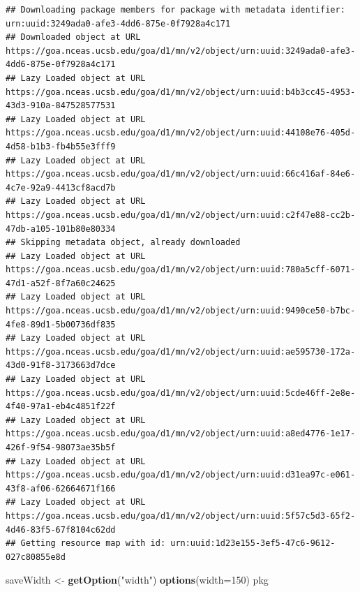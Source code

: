 \documentclass[]{article}
\newenvironment{Shaded}{\begin{snugshade}}{\end{snugshade}}
\newcommand{\DataTypeTok}[1]{\textcolor[rgb]{0.13,0.29,0.53}{#1}}
\newcommand{\DecValTok}[1]{\textcolor[rgb]{0.00,0.00,0.81}{#1}}
\newcommand{\KeywordTok}[1]{\textcolor[rgb]{0.13,0.29,0.53}{\textbf{#1}}}
\newcommand{\NormalTok}[1]{#1}
\newcommand{\StringTok}[1]{\textcolor[rgb]{0.31,0.60,0.02}{#1}}
\begin{document}
\begin{verbatim}
## Downloading package members for package with metadata identifier: urn:uuid:3249ada0-afe3-4dd6-875e-0f7928a4c171
## Downloaded object at URL https://goa.nceas.ucsb.edu/goa/d1/mn/v2/object/urn:uuid:3249ada0-afe3-4dd6-875e-0f7928a4c171
## Lazy Loaded object at URL https://goa.nceas.ucsb.edu/goa/d1/mn/v2/object/urn:uuid:b4b3cc45-4953-43d3-910a-847528577531
## Lazy Loaded object at URL https://goa.nceas.ucsb.edu/goa/d1/mn/v2/object/urn:uuid:44108e76-405d-4d58-b1b3-fb4b55e3fff9
## Lazy Loaded object at URL https://goa.nceas.ucsb.edu/goa/d1/mn/v2/object/urn:uuid:66c416af-84e6-4c7e-92a9-4413cf8acd7b
## Lazy Loaded object at URL https://goa.nceas.ucsb.edu/goa/d1/mn/v2/object/urn:uuid:c2f47e88-cc2b-47db-a105-101b80e80334
## Skipping metadata object, already downloaded
## Lazy Loaded object at URL https://goa.nceas.ucsb.edu/goa/d1/mn/v2/object/urn:uuid:780a5cff-6071-47d1-a52f-8f7a60c24625
## Lazy Loaded object at URL https://goa.nceas.ucsb.edu/goa/d1/mn/v2/object/urn:uuid:9490ce50-b7bc-4fe8-89d1-5b00736df835
## Lazy Loaded object at URL https://goa.nceas.ucsb.edu/goa/d1/mn/v2/object/urn:uuid:ae595730-172a-43d0-91f8-3173663d7dce
## Lazy Loaded object at URL https://goa.nceas.ucsb.edu/goa/d1/mn/v2/object/urn:uuid:5cde46ff-2e8e-4f40-97a1-eb4c4851f22f
## Lazy Loaded object at URL https://goa.nceas.ucsb.edu/goa/d1/mn/v2/object/urn:uuid:a8ed4776-1e17-426f-9f54-98073ae35b5f
## Lazy Loaded object at URL https://goa.nceas.ucsb.edu/goa/d1/mn/v2/object/urn:uuid:d31ea97c-e061-43f8-af06-62664671f166
## Lazy Loaded object at URL https://goa.nceas.ucsb.edu/goa/d1/mn/v2/object/urn:uuid:5f57c5d3-65f2-4d46-83f5-67f8104c62dd
## Getting resource map with id: urn:uuid:1d23e155-3ef5-47c6-9612-027c80855e8d
\end{verbatim}

\begin{Shaded}
\begin{Highlighting}[]
\NormalTok{saveWidth <-}\StringTok{ }\KeywordTok{getOption}\NormalTok{(}\StringTok{"width"}\NormalTok{)}
\KeywordTok{options}\NormalTok{(}\DataTypeTok{width=}\DecValTok{150}\NormalTok{)}
\NormalTok{pkg}
\end{Highlighting}
\end{Shaded}
\end{document}

